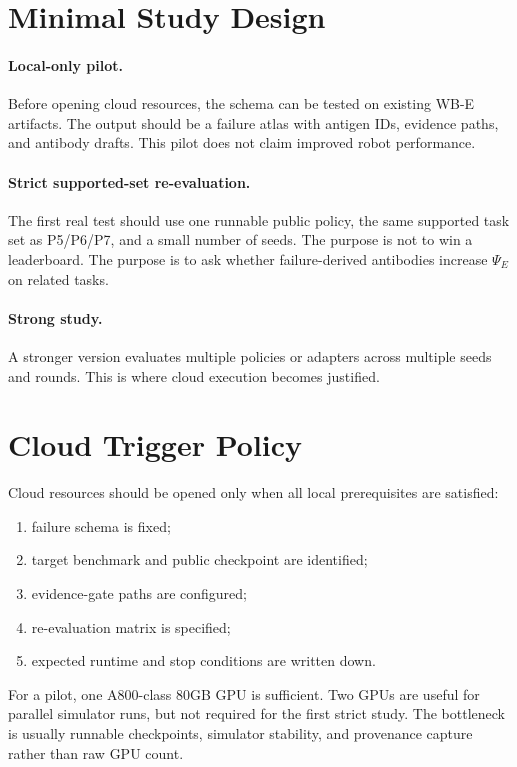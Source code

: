 \documentclass[11pt]{article}
\begin{document}
\section{Minimal Study Design}

\paragraph{Local-only pilot.}
Before opening cloud resources, the schema can be tested on existing WB-E artifacts.
The output should be a failure atlas with antigen IDs, evidence paths, and antibody drafts.
This pilot does not claim improved robot performance.

\paragraph{Strict supported-set re-evaluation.}
The first real test should use one runnable public policy, the same supported task set as P5/P6/P7, and a small number of seeds.
The purpose is not to win a leaderboard.
The purpose is to ask whether failure-derived antibodies increase $\Psi_E$ on related tasks.

\paragraph{Strong study.}
A stronger version evaluates multiple policies or adapters across multiple seeds and rounds.
This is where cloud execution becomes justified.

\section{Cloud Trigger Policy}

Cloud resources should be opened only when all local prerequisites are satisfied:
\begin{enumerate}[leftmargin=*]
  \item failure schema is fixed;
  \item target benchmark and public checkpoint are identified;
  \item evidence-gate paths are configured;
  \item re-evaluation matrix is specified;
  \item expected runtime and stop conditions are written down.
\end{enumerate}

For a pilot, one A800-class 80GB GPU is sufficient.
Two GPUs are useful for parallel simulator runs, but not required for the first strict study.
The bottleneck is usually runnable checkpoints, simulator stability, and provenance capture rather than raw GPU count.
\end{document}
